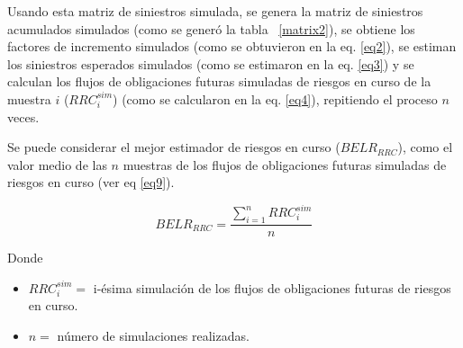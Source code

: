 \documentclass[11pt,twoside,openright,spanish]{report}
\numberwithin{equation}{chapter}
\numberwithin{figure}{chapter}
\numberwithin{table}{chapter}
\begin{document}
Usando esta matriz de siniestros simulada, se genera la matriz de siniestros acumulados simulados (como se generó la tabla ~\ref{matrix2}), se obtiene los factores de incremento simulados (como se obtuvieron en la eq. \ref{eq2}), se estiman los siniestros esperados simulados (como se estimaron en la eq. \ref{eq3}) y se calculan los flujos de obligaciones futuras simuladas de riesgos en curso de la muestra $i$ ($RRC_{i}^{sim}$) (como se calcularon en la eq. \ref{eq4}), repitiendo el proceso $n$ veces.
	
	 
	
	Se puede considerar el mejor estimador de riesgos en curso ($BELR_{RRC}$), como el valor medio de las $n$ muestras de los flujos de obligaciones futuras simuladas de riesgos en curso (ver eq \ref{eq9}).


	 

	
	\begin{equation}
		BELR_{RRC}^{}=\frac{\sum _{i=1}^{n}RRC_{i}^{sim}}{n}
		\label{eq9}
		\end{equation}
			


 
	
	Donde
	
	 
		\begin{itemize}
		\setlength\itemsep{-0.5em}
	\item $RRC_{i}^{sim}=$ i-ésima simulación de los flujos de obligaciones futuras de riesgos en curso.
	
	\item $n=$ número de simulaciones realizadas.
	\end{itemize}
	

	
\end{document}
